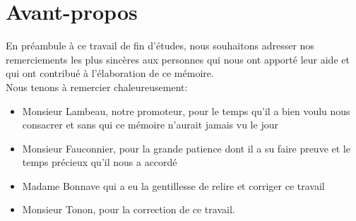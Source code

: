 
\newpage
\chapter*{Avant-propos}
En préambule à ce travail de fin d'études, nous souhaitons adresser nos remerciements les plus sincères aux personnes qui nous ont apporté
leur aide et qui ont contribué à l'élaboration de ce mémoire.\\
\newline
\indent
Nous tenons à remercier chaleureusement:\\
\begin{itemize}
\item Monsieur Lambeau, notre promoteur, pour le temps qu'il a bien voulu nous consacrer et sans qui ce mémoire n'aurait jamais vu le jour\\

\item Monsieur Fauconnier, pour la grande patience dont il a su faire preuve et le temps précieux qu'il nous a accordé\\
\item Madame Bonnave qui a eu la gentillesse de relire et corriger ce travail\\

\item Monsieur Tonon, pour la correction de ce travail.
\end{itemize}
